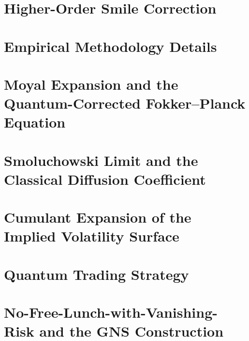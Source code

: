 \documentclass[11pt,letterpaper]{article}
\theoremstyle{plain}
\theoremstyle{definition}
\begin{document}
\section{Higher-Order Smile Correction}
\label{sec:S7}


\section{Empirical Methodology Details}
\label{sec:S8}


\section{Moyal Expansion and the Quantum-Corrected Fokker--Planck Equation}
\label{sec:S9}


\section{Smoluchowski Limit and the Classical Diffusion Coefficient}
\label{sec:S10}


\section{Cumulant Expansion of the Implied Volatility Surface}
\label{sec:S11}


\section{Quantum Trading Strategy}
\label{sec:S12}


\section{No-Free-Lunch-with-Vanishing-Risk and the GNS Construction}
\label{sec:S13}




\end{document}
